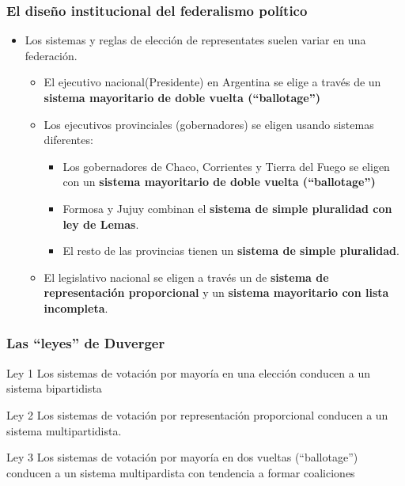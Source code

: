 \documentclass[a4paper,handout,mathserif,final,xcolor=dvipsnames,twocolumn]{beamer}
\begin{document}
\begin{frame}\frametitle{El diseño institucional del federalismo político}
  \begin{itemize}\itemsep 10pt
    \item Los sistemas y reglas de elección de representates suelen
      variar en una federación.
      \begin{itemize}\itemsep 5pt \smallskip
        \item El ejecutivo nacional(Presidente) en Argentina se elige a través de un  \textbf{sistema mayoritario de doble vuelta (``ballotage'')}
          \item Los ejecutivos provinciales (gobernadores) se eligen
            usando sistemas diferentes:
            \begin{itemize}\itemsep 5pt \smallskip
            \item Los gobernadores de Chaco, Corrientes
              y Tierra del Fuego se eligen con un \textbf{sistema mayoritario
              de doble vuelta (``ballotage'')}
              \item Formosa y Jujuy combinan el \textbf{sistema de simple
                pluralidad con ley de Lemas}.
                \item El resto de las provincias tienen un \textbf{sistema de
                  simple pluralidad}. 
            \end{itemize}
            \item El legislativo nacional se
              eligen a través un de \textbf{sistema de representación
              proporcional} y un \textbf{sistema mayoritario con lista
              incompleta}.
            \end{itemize}
\end{itemize}
          \end{frame}


\begin{frame}\frametitle{Las ``leyes'' de Duverger}
 \begin{block}{Ley 1}
Los sistemas de votación por mayoría en una elección conducen a un sistema bipartidista
\end{block}
\begin{block}{Ley 2}
Los sistemas de votación por representación proporcional conducen a un
sistema multipartidista. 
\end{block}
\begin{block}{Ley 3}
Los sistemas de votación por mayoría en dos vueltas (``ballotage'') conducen a un
sistema multipardista con tendencia a formar coaliciones
\end{block}
  \end{frame}
\end{document}
